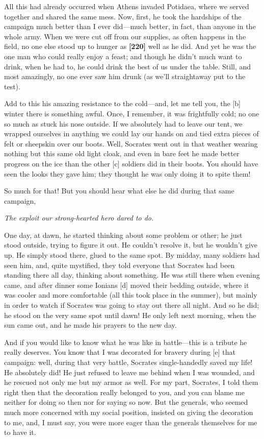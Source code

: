 All this had already occurred when Athens invaded
Potidaea, where we
served together and shared the same mess. Now, first, he took the
hardships of the campaign much better than I ever did---much better, in
fact, than anyone in the whole army. When we were cut off from our
supplies, as often happens in the field, no one else stood up to hunger
as {\bf {[}220{]}} well as he did. And yet he was the one man who could
really enjoy a feast; and though he didn't much want to drink, when he
had to, he could drink the best of us under the table. Still, and most
amazingly, no one ever saw him drunk (as we'll straightaway put to the
test).

Add to this his amazing resistance to the cold---and, let me tell you,
the {[}b{]} winter there is something awful. Once, I remember, it was
frightfully cold; no one so much as stuck his nose outside. If we
absolutely had to leave our tent, we wrapped ourselves in anything we
could lay our hands on and tied extra pieces of felt or sheepskin over
our boots. Well, Socrates went out in that weather wearing nothing but
this same old light cloak, and even in bare feet he made better progress
on the ice than the other {[}c{]} soldiers did in their boots. You
should have seen the looks they gave him; they thought he was only doing
it to spite them!

So much for that! But you should hear what else he did during that same
campaign,\crlf
\crlf

{\em The exploit our strong-hearted hero dared to
do.}\crlf
\crlf

One day, at dawn, he started thinking about some problem or other; he
just stood outside, trying to figure it out. He couldn't resolve it, but
he wouldn't give up. He simply stood there, glued to the same spot. By
midday, many soldiers had seen him, and, quite mystified, they told
everyone that Socrates had been standing there all day, thinking about
something. He was still there when evening came, and after dinner some
Ionians {[}d{]} moved their bedding outside, where it was cooler and
more comfortable (all this took place in the summer), but mainly in
order to watch if Socrates was going to stay out there all night. And so
he did; he stood on the very same spot until dawn! He only left next
morning, when the sun came out, and he made his prayers to the new day.

And if you would like to know what he was like in battle---this is a
tribute he really deserves. You know that I was decorated for bravery
during {[}e{]} that campaign: well, during that very battle, Socrates
single-handedly saved my life! He absolutely did! He just refused to
leave me behind when I was wounded, and he rescued not only me but my
armor as well. For my part, Socrates, I told them right then that the
decoration really belonged to you, and you can blame me neither for
doing so then nor for saying so now. But the generals, who seemed much
more concerned with my social position, insisted on giving the
decoration to me, and, I must say, you were more eager than the generals
themselves for me to have it.

